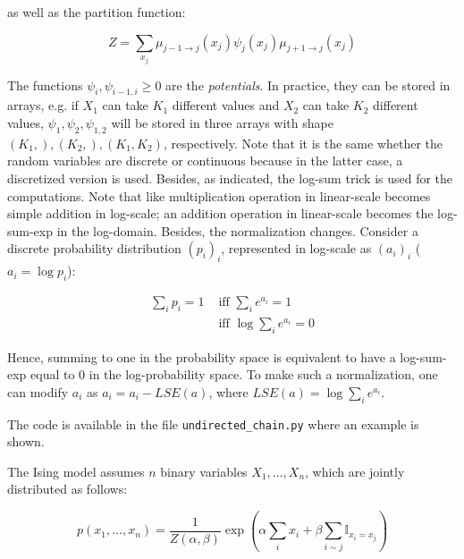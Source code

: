 \documentclass[a4paper, 11pt]{article}
\begin{document}
\begin{enumerate}
    as well as the partition function:
    
    \begin{equation*}
        Z = \sum_{x_j} \mu_{j-1 \rightarrow j} \left( x_j \right) \psi_j \left( x_j \right) \mu_{j+1 \rightarrow j} \left( x_j \right) 
    \end{equation*}
    
    The functions $\psi_i, \psi_{i-1, i} \geq 0$ are the \emph{potentials}. In practice, they can be stored in arrays, e.g. if $X_1$ can take $K_1$ different values and $X_2$ can take $K_2$ different values, $\psi_1, \psi_2, \psi_{1, 2}$ will be stored in three arrays with shape $\left(K_1,\right), \left(K_2,\right), \left(K_1, K_2\right)$, respectively. Note that it is the same whether the random variables are discrete or continuous because in the latter case, a discretized version is used. Besides, as indicated, the log-sum trick is used for the computations. Note that like multiplication operation in linear-scale becomes simple addition in log-scale; an addition operation in linear-scale becomes the log-sum-exp in the log-domain. Besides, the normalization changes. Consider a discrete probability distribution $\left( p_i \right)_i$, represented in log-scale as $\left( a_i \right)_i$ (\ie $a_i = \log p_i$):
    
    \begin{equation*}
        \begin{aligned}
        \sum_i p_i = 1 &\text{ iff } \sum_i e^{a_i} = 1 \\
        &\text{ iff } \log \sum_i e^{a_i} = 0
        \end{aligned}
    \end{equation*}
    
    Hence, summing to one in the probability space is equivalent to have a log-sum-exp equal to $0$ in the log-probability space. To make such a normalization, one can modify $a_i$ as $a_i = a_i - LSE(a)$, where $LSE(a) = \log \sum_i e^{a_i}$.
    
    The code is available in the file \texttt{undirected\_chain.py} where an example is shown. \\
\end{enumerate}

The Ising model assumes $n$ binary variables $X_1, \dots, X_n$, which are jointly distributed as follows:

\begin{equation*}
    p \left( x_1, \dots, x_n \right) = \frac{1}{Z \left( \alpha, \beta \right)} \exp \left( \alpha \sum_{i} x_i + \beta \sum_{i \sim j} \mathbb{I}_{x_i = x_j} \right)
\end{equation*}
\end{document}
